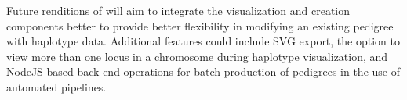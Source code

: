 Future renditions of \app will aim to integrate the visualization and creation components better to provide better flexibility in modifying an existing pedigree with haplotype data. Additional features could include SVG export, the option to view more than one locus in a chromosome during haplotype visualization, and NodeJS based back-end operations for batch production of pedigrees in the use of automated pipelines.

